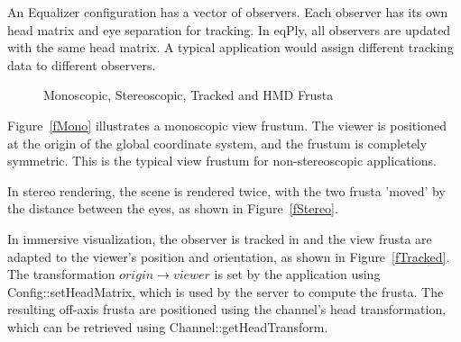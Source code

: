 \documentclass[10pt,a4]{scrartcl}
\newcommand{\fig}[1]{Figure~\ref{#1}}
\begin{document}
An Equalizer configuration has a vector of observers. Each observer has
its own head matrix and eye separation for tracking. In \textsf{eqPly},
all observers are updated with the same head matrix. A typical
application would assign different tracking data to different observers.

\begin{figure}[h!t]
  \hfil
  \hfil
  {\caption{\label{fImmersive}Monoscopic, Stereoscopic, Tracked and HMD
    Frusta}}
\end{figure}

\fig{fMono} illustrates a monoscopic view frustum. The viewer is
positioned at the origin of the global coordinate system, and the
frustum is completely symmetric. This is the typical view frustum for
non-stereoscopic applications.

In stereo rendering, the scene is rendered twice, with the two frusta
'moved' by the distance between the eyes, as shown in \fig{fStereo}.

In immersive visualization, the observer is tracked in and the view
frusta are adapted to the viewer's position and orientation, as shown
in \fig{fTracked}. The transformation $origin \rightarrow viewer$ is set by
the application using \textsf{Config::setHead\-Matrix}, which is used by
the server to compute the frusta. The resulting off-axis frusta are
positioned using the channel's head transformation, which can be
retrieved using \textsf{Channel::getHeadTransform}.
\end{document}
